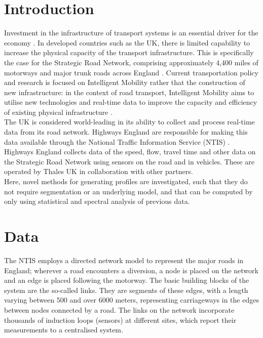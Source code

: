 \documentclass[conference]{IEEEtran}
\begin{document}
\section{Introduction}
Investment in the infrastructure of transport systems is an essential driver for the economy \cite{government}. 
In developed countries such as the UK, there is limited capability to increase the physical capacity of the transport infrastructure. 
This is specifically the case for the Strategic Road Network, comprising approximately 4,400 miles of motorways and major trunk roads across England \cite{Strategic}. 
Current transportation policy and research is focused on Intelligent Mobility rather that the construction of new infrastructure: in the context of road transport, Intelligent Mobility aims to utilise new technologies and real-time data to improve the capacity and efficiency of existing physical infrastructure \cite{needs}.\\

The UK is considered world-leading in its ability to collect and process real-time data from its road network. 
Highways England are responsible for making this data available through the National Traffic Information Service (NTIS) \cite{NTIS}. 
Highways England collects data of the speed, flow, travel time and other data on the Strategic Road Network using sensors on the road and in vehicles. 
These are operated by Thales UK in collaboration with other partners.\\

Here, novel methods for generating profiles are investigated, such that they do not require segmentation or an underlying model, and that can be computed by only using statistical and spectral analysis of previous data.

\section{Data}
The NTIS employs a directed network model to represent the major roads in England; wherever a road encounters a diversion, a node is placed on the network and an edge is placed following the motorway.
The basic building blocks of the system are the so-called links. 
They are segments of these edges, with a length varying between 500 and over 6000 meters, representing carriageways in the edges between nodes connected by a road. 
The links on the network incorporate thousands of induction loops (sensors) at different sites, which report their measurements to a centralised system.\\
\end{document}
